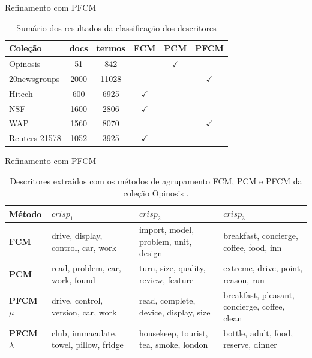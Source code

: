 \documentclass[brazil]{beamer}
\begin{document}
\begin{frame}{Refinamento com PFCM}

  \begin{table}[!htp]
    \centering
    \begin{tabular}{ |l|c c c c c|}
      \hline
      {\bf Coleção} & {\bf docs} & {\bf termos} & {\bf FCM} & {\bf
    PCM} & {\bf PFCM} \\
      \hline
      Opinosis & 51 & 842 &  & $\checkmark$ &  \\
      \hline
      20newsgroups & 2000 & \alert{11028} &  & & $\checkmark$\\
      \hline
      Hitech & 600 & 6925 & $\checkmark$ & & \\
      \hline
      NSF & 1600 & 2806 & $\checkmark$ & & \\
      \hline
      WAP & 1560 & \alert{8070} &  & & $\checkmark$ \\
      \hline
      Reuters-21578 & 1052 & 3925 & $\checkmark$ & & \\
      \hline
    \end{tabular}
    \caption{Sumário dos resultados da classificação dos descritores}
    \label{table:pfcmsummary}
  \end{table}

\end{frame}

\begin{frame}{Refinamento com PFCM}

  \begin{table}[!htp]
    \centering
    \begin{tabular}{ |l|p{2.5cm} | p{2.5cm} | p{2.5cm}|}
      \hline
      {\bf Método} & $crisp_1$ & $crisp_2$ & $crisp_3$ \\
      \hline
      {\bf FCM} & drive, display, control, \alert{car}, work & 
      import, {\color{blue}model}, problem, unit, design & breakfast,
      {\color{green!50!black}concierge}, coffee, food, inn \\
      \hline
      {\bf PCM} & read, problem, \alert{car}, work, found & 
      turn, size, quality, review, feature & extreme, drive, point, reason, run\\
      \hline
      {\bf PFCM $\mu$} & drive, control, version, \alert{car}, work  & read, complete,
      {\color{blue}device},
      display, size & breakfast, pleasant, {\color{green!50!black}concierge}, coffee, clean \\
      \hline
      {\bf PFCM $\lambda$} & club, immaculate, towel, pillow,
      fridge & housekeep, tourist, tea, smoke, london & bottle, adult, food, reserve, dinner\\
      \hline
    \end{tabular}
    \caption{Descritores extraídos com os métodos de agrupamento FCM, PCM e PFCM da coleção Opinosis
    .}
    \label{table:pfcmdescriptors}
  \end{table}

\end{frame}
\end{document}

